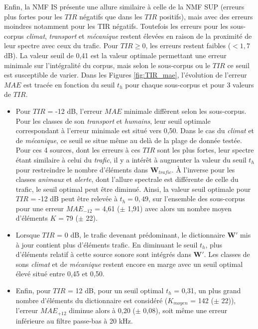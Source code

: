Enfin, la NMF IS présente une allure similaire à celle de la NMF SUP (erreurs plus fortes pour les $TIR$ négatifs que dans les $TIR$ positifs), mais avec des erreurs moindres notamment pour les TIR négatifs. Toutefois les erreurs pour les sous-corpus \textit{climat}, \textit{transport} et \textit{mécanique} restent élevées en raison de la proximité de leur spectre avec ceux du trafic. Pour $TIR \geq 0$, les erreurs restent faibles ($< 1,7$ dB). La valeur seuil de 0,41 est la valeur optimale permettant une erreur minimale sur l'intégralité du corpus, mais selon le sous-corpus ou le $TIR$ ce seuil est susceptible de varier.
Dans les Figures \ref{fig:TIR_mae}, l'évolution de l'erreur $MAE$ est tracée en fonction du seuil $t_h$ pour chaque sous-corpus et pour 3 valeurs de $TIR$.
\begin{itemize}
\item Pour $TIR$ = -12 dB, l'erreur $MAE$ minimale diffèrent selon les sous-corpus.
Pour les classes de son \textit{transport} et \textit{humains}, leur seuil optimale correspondant à l'erreur minimale est situé vers 0,50. Dans le cas du \textit{climat} et de \textit{mécanique}, ce seuil se situe même au delà de la plage de donnée testée.  Pour ces 4 sources, dont les erreurs à ces $TIR$ sont les plus fortes, leur spectre étant similaire à celui du \textit{trafic}, il y a intérêt à augmenter la valeur du seuil $t_h$ pour restreindre le nombre d'éléments dans $\mathbf{W}_{trafic}$. À l'inverse pour  les classes \textit{animaux} et \textit{alerte}, dont l'allure spectrale est différente de celle du trafic, le seuil optimal peut être diminué.
Ainsi, la valeur seuil optimale pour $TIR$ = -12 dB peut être relevée à $t_h = 0,49$, sur l'ensemble des sous-corpus pour une erreur $MAE_{-12}$ = 4,61 ($\pm$ 1,91) avec alors un nombre moyen d'éléments $K$ = 79 ($\pm$ 22).
\item Lorsque $TIR$ = 0 dB, le trafic devenant prédominant, le dictionnaire $\mathbf{W'}$ mis à jour contient plus d'éléments trafic. En diminuant le seuil $t_h$, plus d'éléments relatif à cette source sonore sont intégrés dans $\mathbf{W'}$.
Les classes de sons \textit{climat} et de \textit{mécanique} restent encore en marge avec un seuil optimal élevé situé entre 0,45 et 0,50.
\item Enfin, pour $TIR$ = 12 dB, pour un seuil optimal $t_h$ = 0,31, un plus grand nombre d'éléments du dictionnaire est considéré ($K_{moyen}$ = 142 ($\pm$ 22)), l'erreur $MAE_{+12}$ diminue alors à 0,20 ($\pm$ 0,08), soit même une erreur inférieure au filtre passe-bas à 20 kHz.\\
\end{itemize}

